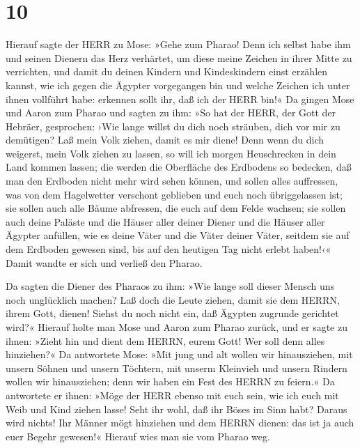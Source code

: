\hypertarget{section-9}{%
\section{10}\label{section-9}}

 Hierauf sagte der HERR zu Mose: »Gehe zum Pharao! Denn
ich selbst habe ihm und seinen Dienern das Herz verhärtet, um diese
meine Zeichen in ihrer Mitte zu verrichten,  und damit du
deinen Kindern und Kindeskindern einst erzählen kannst, wie ich gegen
die Ägypter vorgegangen bin und welche Zeichen ich unter ihnen vollführt
habe: erkennen sollt ihr, daß ich der HERR bin!«  Da
gingen Mose und Aaron zum Pharao und sagten zu ihm: »So hat der HERR,
der Gott der Hebräer, gesprochen: ›Wie lange willst du dich noch
sträuben, dich vor mir zu demütigen? Laß mein Volk ziehen, damit es mir
diene!  Denn wenn du dich weigerst, mein Volk ziehen zu
lassen, so will ich morgen Heuschrecken in dein Land kommen lassen;
 die werden die Oberfläche des Erdbodens so bedecken, daß
man den Erdboden nicht mehr wird sehen können, und sollen alles
auffressen, was von dem Hagelwetter verschont geblieben und euch noch
übriggelassen ist; sie sollen auch alle Bäume abfressen, die euch auf
dem Felde wachsen;  sie sollen auch deine Paläste und die
Häuser aller deiner Diener und die Häuser aller Ägypter anfüllen, wie es
deine Väter und die Väter deiner Väter, seitdem sie auf dem Erdboden
gewesen sind, bis auf den heutigen Tag nicht erlebt haben!‹« Damit
wandte er sich und verließ den Pharao.

 Da sagten die Diener des Pharaos zu ihm: »Wie lange soll
dieser Mensch uns noch unglücklich machen? Laß doch die Leute ziehen,
damit sie dem HERRN, ihrem Gott, dienen! Siehst du noch nicht ein, daß
Ägypten zugrunde gerichtet wird?«  Hierauf holte man Mose
und Aaron zum Pharao zurück, und er sagte zu ihnen: »Zieht hin und dient
dem HERRN, eurem Gott! Wer soll denn alles hinziehen?«  Da
antwortete Mose: »Mit jung und alt wollen wir hinausziehen, mit unsern
Söhnen und unsern Töchtern, mit unserm Kleinvieh und unsern Rindern
wollen wir hinausziehen; denn wir haben ein Fest des HERRN zu feiern.«
 Da antwortete er ihnen: »Möge der HERR ebenso mit euch
sein, wie ich euch mit Weib und Kind ziehen lasse! Seht ihr wohl, daß
ihr Böses im Sinn habt?  Daraus wird nichts! Ihr Männer
mögt hinziehen und dem HERRN dienen: das ist ja auch euer Begehr
gewesen!« Hierauf wies man sie vom Pharao weg.

